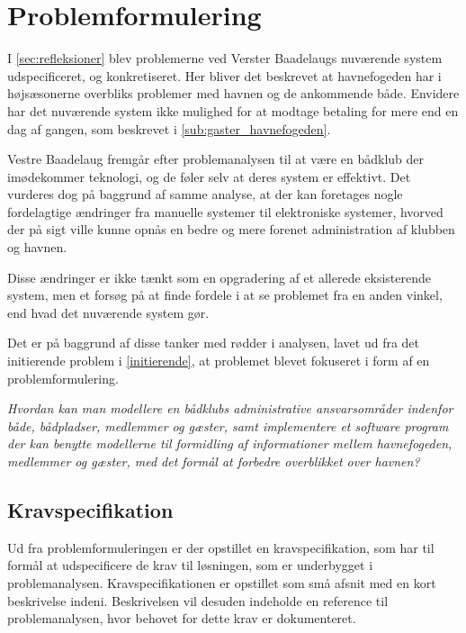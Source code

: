 \chapter{Problemformulering}
\label{cha:problemformulering}

I \cref{sec:refleksioner} blev problemerne ved Verster Baadelaugs nuværende system udspecificeret, og konkretiseret. Her bliver det beskrevet at havnefogeden har i højsæsonerne overbliks problemer med havnen og de ankommende både. Envidere har det nuværende system ikke mulighed for at modtage betaling for mere end en dag af gangen, som beskrevet i \cref{sub:gaster_havnefogeden}. 

Vestre Baadelaug fremgår efter problemanalysen til at være en bådklub der imødekommer teknologi, og de føler selv at deres system er effektivt. Det vurderes dog på baggrund af samme analyse, at der kan foretages nogle fordelagtige ændringer fra manuelle systemer til elektroniske systemer, hvorved der på sigt ville kunne opnås en bedre og mere forenet administration af klubben og havnen.

Disse ændringer er ikke tænkt som en opgradering af et allerede eksisterende system, men et forsøg på at finde fordele i at se problemet fra en anden vinkel, end hvad det nuværende system gør.

Det er på baggrund af disse tanker med rødder i analysen, lavet ud fra det initierende problem i \cref{initierende}, at problemet blevet fokuseret i form af en problemformulering. 

\begin{displayquote}
\textit{Hvordan kan man modellere en bådklubs administrative ansvarsområder indenfor både, bådpladser, medlemmer og gæster, samt implementere et software program der kan benytte modellerne til formidling af informationer mellem havnefogeden, medlemmer og gæster, med det formål at forbedre overblikket over havnen?}
\end{displayquote}

\section{Kravspecifikation} %
\label{sec:Kravspecifikation}

Ud fra problemformuleringen er der opstillet en kravspecifikation, som har til formål at udspecificere de krav til løsningen, som er underbygget i problemanalysen. Kravspecifikationen er opstillet som små afsnit med en kort beskrivelse indeni. Beskrivelsen vil desuden indeholde en reference til problemanalysen, hvor behovet for dette krav er dokumenteret.
 

